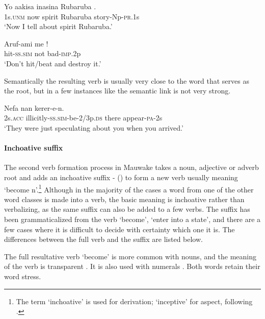 \ea%
\label{ex:3:x188}
\gll Yo aakisa inasina Rubaruba .\\
1s.\textsc{unm} now spirit Rubaruba story-Np-\textsc{pr}.1s \\
\glt`Now I tell about spirit Rubaruba.'
\z

\ea%
\label{ex:3:x189}
\gll Aruf-ami me !\\
hit-\textsc{ss}.\textsc{sim} not bad-\textsc{imp}.2p \\
\glt`Don't hit/beat and destroy it.' 
\z

Semantically the resulting verb is usually very close to the word that serves as the root, but in a few instances like  the semantic link is not very strong.

\ea%
\label{ex:3:x190}
\gll Nefa  nan kerer-e-n. \\
2s.\textsc{acc} illicitly-\textsc{ss}.\textsc{sim}-be-2/3p.\textsc{ds} there appear-\textsc{pa}-2s \\
\glt`They were just speculating about you when you arrived.' 
\z

\paragraph{Inchoative suffix} \label{sec:3:a:z:y:x}
{}
The second verb formation process in Mauwake takes a noun, adjective or adverb root and adds an inchoative suffix - () to form a new verb usually meaning `become n'.\footnote{The term `inchoative' is used for derivation; `inceptive' for aspect, following \citet[95]{Payne1997}.} Although in the majority of the cases a word from one of the other word classes is made into a verb, the basic meaning is inchoative rather than verbalizing, as the same suffix can also be added to a few verbs. The suffix has been grammaticalized from the verb \textstyleEmphasizedVernacularWords{-} `become', `enter into a state', and there are a few cases where it is difficult to decide with certainty which one it is. The differences between the full verb and the suffix are listed below. 

The full resultative verb \textstyleEmphasizedVernacularWords{-} `become' is more common with nouns, and the meaning of the verb is transparent . It is also used with numerals . Both words retain their word stress.

